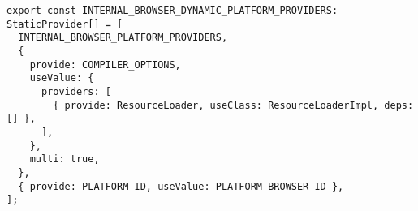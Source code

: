 \begin{verbatim}
export const INTERNAL_BROWSER_DYNAMIC_PLATFORM_PROVIDERS: StaticProvider[] = [
  INTERNAL_BROWSER_PLATFORM_PROVIDERS,
  {
    provide: COMPILER_OPTIONS,
    useValue: {
      providers: [
        { provide: ResourceLoader, useClass: ResourceLoaderImpl, deps: [] },
      ],
    },
    multi: true,
  },
  { provide: PLATFORM_ID, useValue: PLATFORM_BROWSER_ID },
];
\end{verbatim}
